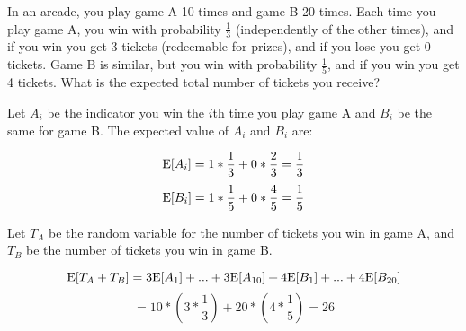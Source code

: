\question In an arcade, you play game A 10 times and game B 20 times. Each time you play game A, you
win with probability $\frac{1}{3}$ (independently of the other times), and if you win you get 3 tickets
(redeemable for prizes), and if you lose you get 0 tickets. Game B is similar, but you win with
probability $\frac{1}{5}$, and if you win you get 4 tickets. What is the expected total number of tickets
you receive?

\begin{solution}[4 cm]
Let $A_i$ be the indicator you win the $i$th time you play game A and $B_i$ be the same for game B.
The expected value of $A_i$ and $B_i$ are:
\begin{center}
\[\text{E}[A_i] = 1*\frac{1}{3} + 0*\frac{2}{3} = \frac{1}{3}\]
\[\text{E}[B_i] = 1*\frac{1}{5} + 0*\frac{4}{5} = \frac{1}{5}\]
\end{center}
Let $T_A$ be the random variable for the number of tickets you win in game A, and $T_B$ be the number of tickets you win in game B. 
\begin{center}
\[\text{E}[T_A + T_B] = 3\text{E}[A_1] + ... + 3\text{E}[A_{10}] + 4\text{E}[B_1] + ... + 4\text{E}[B_{20}]\]
\[=10*(3*\frac{1}{3}) + 20*(4*\frac{1}{5}) = 26 \]
\end{center}
\end{solution}